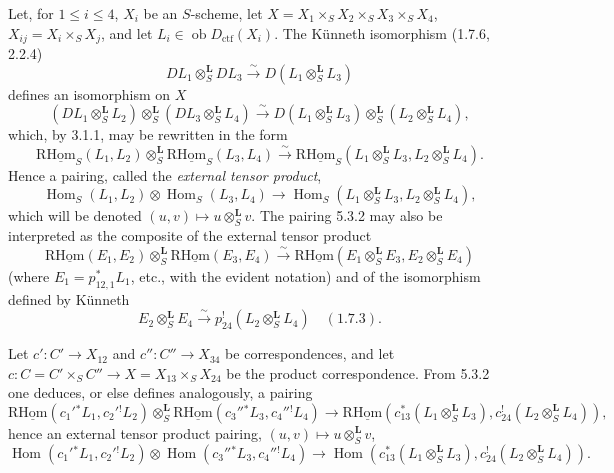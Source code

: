 \documentclass[11pt]{article}
\DeclareMathOperator{\Hom}{Hom}
\providecommand{\Hom}{\operatorname{Hom}}
\providecommand{\Hom}{\operatorname{Hom}}
\begin{document}
Let, for $1\leq i\leq 4$, $X_i$ be an $S$-scheme, let $X=X_1\times_SX_2\times_SX_3\times_SX_4$, $X_{ij}=X_i\times_SX_j$, and let $L_i\in\operatorname{ob}D_{\mathrm{ctf}}(X_i)$. The Künneth isomorphism (1.7.6, 2.2.4)
\[
DL_1\otimes_S^{\mathbf L}DL_3\xrightarrow{\sim}D(L_1\otimes_S^{\mathbf L}L_3)
\]
defines an isomorphism on $X$
\begin{equation}
\tag{5.3.1}
(DL_1\otimes_S^{\mathbf L}L_2)\otimes_S^{\mathbf L}(DL_3\otimes_S^{\mathbf L}L_4)
\xrightarrow{\sim}D(L_1\otimes_S^{\mathbf L}L_3)\otimes_S^{\mathbf L}(L_2\otimes_S^{\mathbf L}L_4),
\end{equation}
which, by 3.1.1, may be rewritten in the form
\begin{equation}
\tag{5.3.2}
\mathrm{R}\underline{\mathrm{Hom}}_S(L_1,L_2)\otimes_S^{\mathbf L}\mathrm{R}\underline{\mathrm{Hom}}_S(L_3,L_4)
\xrightarrow{\sim}\mathrm{R}\underline{\mathrm{Hom}}_S(L_1\otimes_S^{\mathbf L}L_3,L_2\otimes_S^{\mathbf L}L_4).
\end{equation}
Hence a pairing, called the \emph{external tensor product},
\begin{equation}
\tag{5.3.3}
\Hom_S(L_1,L_2)\otimes\Hom_S(L_3,L_4)
\longrightarrow\Hom_S(L_1\otimes_S^{\mathbf L}L_3,L_2\otimes_S^{\mathbf L}L_4),
\end{equation}
which will be denoted $(u,v)\mapsto u\otimes_S^{\mathbf L}v$. The pairing 5.3.2 may also be interpreted as the composite of the external tensor product
\[
\mathrm{R}\underline{\mathrm{Hom}}(E_1,E_2)\otimes_S^{\mathbf L}\mathrm{R}\underline{\mathrm{Hom}}(E_3,E_4)
\xrightarrow{\sim}\mathrm{R}\underline{\mathrm{Hom}}(E_1\otimes_S^{\mathbf L}E_3,E_2\otimes_S^{\mathbf L}E_4)
\]
(where $E_1=p_{12,1}^*L_1$, etc., with the evident notation) and of the isomorphism defined by Künneth
\[
E_2\otimes_S^{\mathbf L}E_4\xrightarrow{\sim}p_{24}^!(L_2\otimes_S^{\mathbf L}L_4)\quad (1.7.3).
\]

Let $c':C'\to X_{12}$ and $c'':C''\to X_{34}$ be correspondences, and let $c:C=C'\times_SC''\to X=X_{13}\times_SX_{24}$ be the product correspondence. From 5.3.2 one deduces, or else defines analogously, a pairing
\begin{equation}
\tag{5.3.4}
\mathrm{R}\underline{\mathrm{Hom}}(c_1'{}^*L_1,c_2'{}^!L_2)\otimes_S^{\mathbf L}\mathrm{R}\underline{\mathrm{Hom}}(c_3''{}^*L_3,c_4''{}^!L_4)
\longrightarrow\mathrm{R}\underline{\mathrm{Hom}}(c_{13}^*(L_1\otimes_S^{\mathbf L}L_3),c_{24}^!(L_2\otimes_S^{\mathbf L}L_4)),
\end{equation}
hence an external tensor product pairing, $(u,v)\mapsto u\otimes_S^{\mathbf L}v$,
\begin{equation}
\tag{5.3.5}
\Hom(c_1'{}^*L_1,c_2'{}^!L_2)\otimes\Hom(c_3''{}^*L_3,c_4''{}^!L_4)
\longrightarrow\Hom(c_{13}^*(L_1\otimes_S^{\mathbf L}L_3),c_{24}^!(L_2\otimes_S^{\mathbf L}L_4)).
\end{equation}
\end{document}
